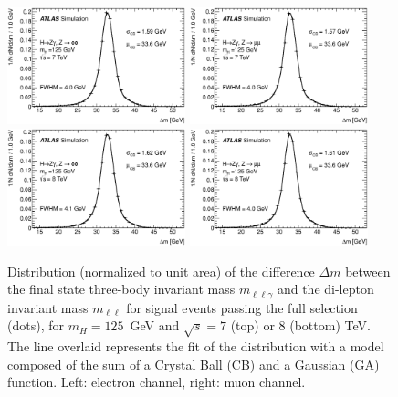\begin{figure}[!htbp]
  \begin{center}
  {\includegraphics[width=0.46\textwidth]{figures/linPlot_125_EtaZgamma_Cat0_all_e_mc11c_mDif}}
  {\includegraphics[width=0.46\textwidth]{figures/linPlot_125_EtaZgamma_Cat0_all_mu_mc11c_mDif}}
  {\includegraphics[width=0.46\textwidth]{figures/linPlot_125_EtaZgamma_Cat0_all_e_mc12a_mDif}}
  {\includegraphics[width=0.46\textwidth]{figures/linPlot_125_EtaZgamma_Cat0_all_mu_mc12a_mDif}}
    \caption{Distribution (normalized to unit area) of the difference $\Delta m$ 
      between the final state three-body invariant mass
      $m_{\ell\ell\gamma}$ and the di-lepton invariant mass
      $m_{\ell\ell}$ for signal events
      passing the full selection (dots), for $m_H = 125$~GeV and $\sqrt{s}=7$ (top) or 8 (bottom) TeV. 
      The line overlaid represents the fit of the distribution with a
      model composed of the sum of a Crystal Ball (CB) and a Gaussian (GA) function.
      Left: electron channel, right: muon channel. 
    }
    \label{fig:resolution_model_example_8tev_H125}
  \end{center}
\end{figure}

